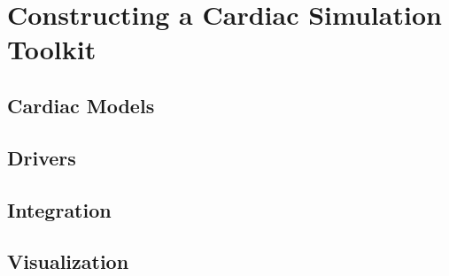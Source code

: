 \chapter{Constructing a Cardiac Simulation Toolkit}

\section{Cardiac Models}

\section{Drivers}

\section{Integration}

\section{Visualization}

